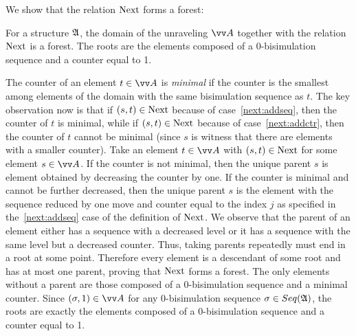 We show that the relation $\mathrm{Next}$ forms a forest:
\begin{lemma}
  For a structure ${\mathfrak{A}}$, the domain of the unraveling $\unraveldom{A}$ together with the relation $\mathrm{Next}$ is a forest. The roots are the elements composed of a 0-bisimulation sequence and a counter equal to 1.
\end{lemma}
\begin{proofsketch}
  The counter of an element $t \in \unraveldom{A}$ is \emph{minimal} if the counter is the smallest among elements of the domain with the same bisimulation sequence as $t$.
  The key observation now is that if $(s,t) \in \mathrm{Next}$ because of case~\ref{next:addseq}, then the counter of $t$ is minimal, while if $(s,t) \in \mathrm{Next}$ because of case~\ref{next:addctr}, then the counter of $t$ cannot be minimal (since $s$ is witness that there are elements with a smaller counter).
  Take an element $t \in \unraveldom{A}$ with $(s, t) \in \mathrm{Next}$ for some element $s \in \unraveldom{A}$.
  If the counter is not minimal, then the unique parent $s$ is element obtained by decreasing the counter by one.
  If the counter is minimal and cannot be further decreased, then the unique parent $s$ is the element with the sequence reduced by one move and counter equal to the index $j$ as specified in the~\ref{next:addseq} case of the definition of $\mathrm{Next}$.
  We observe that the parent of an element either has a sequence with a decreased level or it has a sequence with the same level but a decreased counter.
  Thus, taking parents repeatedly must end in a root at some point.
  Therefore every element is a descendant of some root and has at most one parent, proving that $\mathrm{Next}$ forms a forest.
  The only elements without a parent are those composed of a 0-bisimulation sequence and a minimal counter.
  Since $(\sigma, 1) \in \unraveldom{A}$ for any 0-bisimulation sequence $\sigma \in \Seq{A}$, the roots are exactly the elements composed of a 0-bisimulation sequence and a counter equal to 1.
\end{proofsketch}

